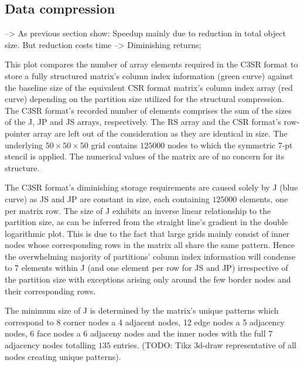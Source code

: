 \documentclass{article}
\begin{document}
  \subsection{Data compression}

  --> As previous section show: Speedup mainly due to reduction in total object size. But reduction costs time --> Diminishing returns;

    This plot compares the number of array elements required in the C3SR format to store a fully structured matrix's column index information (green curve) against the baseline size of the equivalent CSR format matrix's column index array (red curve) depending on the partition size utilized for the structural compression. The C3SR format's recorded number of elements comprises the sum of the sizes of the J, JP and JS arrays, respectively. The RS array and the CSR format's row-pointer array are left out of the consideration as they are identical in size. The underlying $50 \times 50 \times 50$ grid contains $125000$ nodes to which the symmetric 7-pt stencil is applied. The numerical values of the matrix are of no concern for its structure.

    The C3SR format's diminishing storage requirements are caused solely by J (blue curve) as JS and JP are constant in size, each containing $125000$ elements, one per matrix row. The size of J exhibits an inverse linear relationship to the partition size, as can be inferred from the straight line's gradient in the double logarithmic plot. This is due to the fact that large grids mainly consist of inner nodes whose corresponding rows in the matrix all share the same pattern. Hence the overwhelming majority of partitions' column index information will condense to 7 elements within J (and one element per row for JS and JP) irrespective of the partition size with exceptions arising only around the few border nodes and their corresponding rows.

    The minimum size of J is determined by the matrix's unique patterns which correspond to 8 corner nodes a 4 adjacent nodes, 12 edge nodes a 5 adjacency nodes, 6 face nodes a 6 adjaceny nodes and the inner nodes with the full 7 adjacency nodes totalling $135$ entries. (TODO: Tikz 3d-draw representative of all nodes creating unique patterns).
\end{document}
